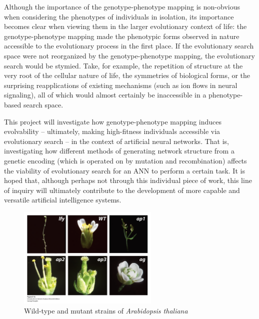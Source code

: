 Although the importance of the genotype-phenotype mapping is non-obvious when considering the phenotypes of individuals in isolation, its importance becomes clear when viewing them in the larger evolutionary context of life: the genotype-phenotype mapping made the phenotypic forms observed in nature accessible to the evolutionary process in the first place. If the evolutionary search space were not reorganized by the genotype-phenotype mapping, the evolutionary search would be stymied.  Take, for example, the repetition of structure at the very root of the cellular nature of life, the symmetries of biological forms, or the surprising  reapplications of existing mechanisms (such as ion flows in neural signaling), all of which would almost certainly be inaccessible in a phenotype-based search space.

This project will investigate how genotype-phenotype mapping induces evolvability -- ultimately, making high-fitness individuals accessible via evolutionary search -- in the context of artificial neural networks. That is, investigating how different methods of generating network structure from a genetic encoding (which is operated on by mutation and recombination) affects the viability of evolutionary search for an ANN to perform a certain task. It is hoped that, although perhaps not through this individual piece of work, this line of inquiry will ultimately contribute to the development of more capable and versatile artificial intelligence systems.

\begin{figure}
\centering
\includegraphics[width=0.6\textwidth]{arabidopsis_mutations.png}
\caption{\label{fig:arabidopsis_mutants}Wild-type and mutant strains of \textit{Arabidopsis thaliana} \cite{Griffiths2015IntroductionAnalysis}} 
\end{figure}